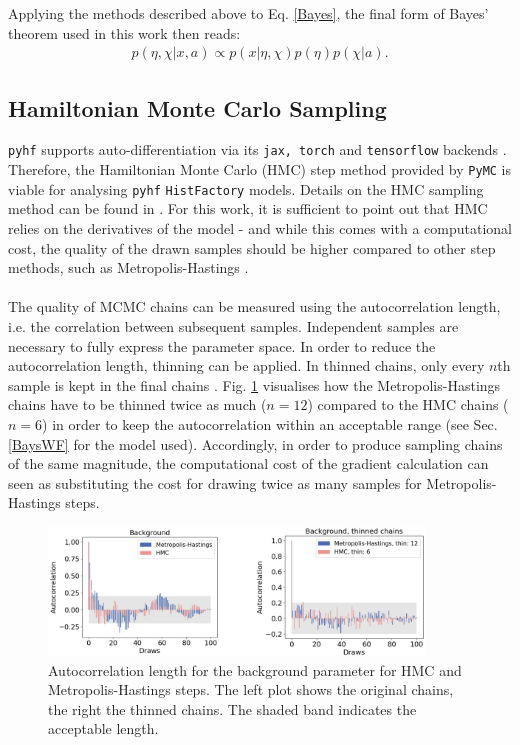 \noindent Applying the methods described above to Eq. \eqref{Bayes}, the final form of Bayes' theorem used in this work then reads:
    \begin{align} \label{BayesConj_final}
        p(\eta, \chi \vert x, a) \propto p(x\vert \eta, \chi) p(\eta) p(\chi | a).
    \end{align}


\subsection{Hamiltonian Monte Carlo Sampling}
\texttt{pyhf} supports auto-differentiation via its \texttt{jax, torch} and \texttt{tensorflow} backends \cite{pyhf, pyhf_joss, jax2018github, tensorflow2015-whitepaper, paszke2017automatic}. Therefore, the Hamiltonian Monte Carlo (HMC) step method provided by \texttt{PyMC} is viable for analysing \texttt{pyhf} \texttt{HistFactory} models. Details on the HMC sampling method can be found in \cite{vishnoi2021introduction}. For this work, it is sufficient to point out that HMC relies on the derivatives of the model - and while this comes with a computational cost, the quality of the drawn samples should be higher compared to other step methods, such as Metropolis-Hastings \cite{Metropolis1953}. \\ \\
\noindent The quality of MCMC chains can be measured using the autocorrelation length, i.e. the correlation between subsequent samples. Independent samples are necessary to fully express the parameter space. In order to reduce the autocorrelation length, thinning can be applied. In thinned chains, only every $n$th sample is kept in the final chains \cite{hoyer2017xarray}. Fig. \ref{autocorr} visualises how the Metropolis-Hastings chains have to be thinned twice as much ($n=12$) compared to the HMC chains ($n=6$) in order to keep the autocorrelation within an acceptable range (see Sec. \ref{BaysWF} for the model used). Accordingly, in order to produce sampling chains of the same magnitude, the computational cost of the gradient calculation can seen as substituting the cost for drawing twice as many samples for Metropolis-Hastings steps.
    \begin{figure}%
        \centering
        \includegraphics[width=10cm]{figures/autocorr.png}
        \centering
        \caption{Autocorrelation length for the background parameter for HMC and Metropolis-Hastings steps. The left plot shows the original chains, the right the thinned chains. The shaded band indicates the acceptable length.}
        \label{autocorr}
    \end{figure}

